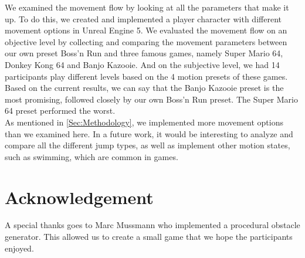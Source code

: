 \documentclass[conference]{IEEEtran}
\begin{document}
We examined the movement flow by looking at all the parameters that make it up.
To do this, we created and implemented a player character with different movement options in Unreal Engine 5.
We evaluated the movement flow on an objective level by collecting and comparing the movement parameters between our own preset Boss'n Run and three famous games, namely Super Mario 64, Donkey Kong 64 and Banjo Kazooie.
And on the subjective level, we had 14 participants play different levels based on the 4 motion presets of these games.
Based on the current results, we can say that the Banjo Kazooie preset is the most promising, followed closely by our own Boss'n Run preset.
The Super Mario 64 preset performed the worst. \\
As mentioned in \ref{Sec:Methodology}, we implemented more movement options than we examined here. 
In a future work, it would be interesting to analyze and compare all the different jump types, as well as implement other motion states, such as swimming, which are common in games.

\section*{Acknowledgement}

A special thanks goes to Marc Mussmann who implemented a procedural obstacle generator.
This allowed us to create a small game that we hope the participants enjoyed.












\end{document}
